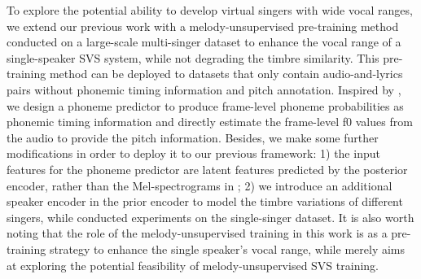 To explore the potential ability to develop virtual singers with wide vocal ranges, we extend our previous work \cite{zhou22f_interspeech} with a melody-unsupervised pre-training method conducted on a large-scale multi-singer dataset to enhance the vocal range of a single-speaker SVS system, while not degrading the timbre similarity.
This pre-training method can be deployed to datasets that only contain audio-and-lyrics pairs without phonemic timing information and pitch annotation.
Inspired by \cite{choi2022melody}, we design a phoneme predictor to produce frame-level phoneme probabilities as phonemic timing information and directly estimate the frame-level f0 values from the audio to provide the pitch information.
Besides, we make some further modifications in order to deploy it to our previous framework: 1) the input features for the phoneme predictor are latent features predicted by the posterior encoder, rather than the Mel-spectrograms in \cite{choi2022melody}; 2) we introduce an additional speaker encoder in the prior encoder to model the timbre variations of different singers, while \cite{choi2022melody} conducted experiments on the single-singer dataset.
It is also worth noting that the role of the melody-unsupervised training in this work is as a pre-training strategy to enhance the single speaker's vocal range, while \cite{choi2022melody} merely aims at exploring the potential feasibility of melody-unsupervised SVS training.
